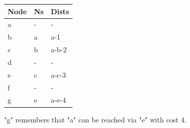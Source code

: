 \documentclass[12pt, oneandhalf, chaparabic, sees, ms]{metu}
\begin{document}
 
\begin{center}
 \begin{figure}[!htp]
  \begin{center}
   \noindent \begin{minipage}{.7\textwidth}
   \end{minipage}%
   \hfill
    \noindent \begin{minipage}{0.3\textwidth}
    
    \begin{tabular}{ | l | l | l | }
    \hline
    \rowcolor{lightgray}
    Node & Ns & Dists \\ \hline \hline
    a    & -  & -     \\ \hline
    b    & a  & a-1   \\ \hline
    c    & b  & a-b-2 \\ \hline
    d    & -  & -     \\ \hline
    e    & c  & a-c-3 \\ \hline
    f    & -  & -     \\ \hline
    g    & e  & a-e-4 \\
    \hline
   \end{tabular}
   \end{minipage}
   
   \end{center}
    \caption{"g" remembers that "a" can be reached via "e" with cost 4.}
    \label{fig:lagoon-graph6}
  \end{figure}
\end{center}
 
 
 
\end{document}
